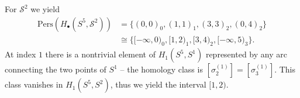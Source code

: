 \begin{example}{\cite[\S 2.4, Example]{de2011dualities}}
	For $\mathcal{S}^{2}$ we yield
	\begin{align}
		\mathrm{Pers}(H_{\bullet}(S^{5},\mathcal{S}^{2})) & = \{(0,0)_{0}, (1,1)_{1}, (3,3)_{2}, (0,4)_{2}\}               \\
		                                                  & \cong \{[-\infty, 0)_{0}, [1,2)_{1}, [3,4)_{2}, [-\infty,5)_{3}\}.
	\end{align}
	At index $1$ there is a nontrivial element of $H_{1}(S^{5},S^{1})$ represented
	by any arc connecting the two points of $S^{1}$ --
	the homology class is $[\sigma_{2}^{(1)}] = [\sigma_{3}^{(1)}]$. This class vanishes in $H_{1}(S^{5},S^{2})$, thus we yield the interval $[1,2)$.
\end{example}

